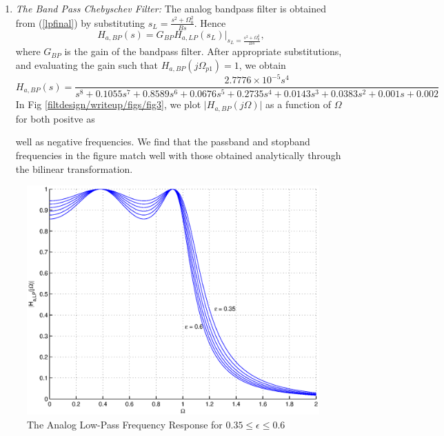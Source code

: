 \documentclass{article}
\begin{document}
\begin{enumerate}
\item {\em The Band Pass Chebyschev Filter:}  The analog bandpass filter is obtained from (\ref{lpfinal}) by substituting
$s_L = \frac{s^2 + \Omega_0^2}{Bs}$.  Hence
\begin{equation}
H_{a,BP}(s) = G_{BP}H_{a,LP}(s_L)\vert_{s_L = \frac{s^2 + \Omega_0^2}{Bs}},
\end{equation}
where $G_{BP}$ is the gain of the bandpass filter.  After appropriate substitutions, and evaluating the gain 
such that $H_{a,BP}(j\Omega_{p1}) = 1$, we obtain
{\tiny
\begin{equation}
\label{bpfinal}
H_{a,BP}(s) = \frac{2.7776\times 10^{-5}s^4}{s^8+0.1055s^7+0.8589s^6+0.0676s^5+0.2735s^4+0.0143s^3+0.0383s^2+0.001s+0.002}
\end{equation}
}
In Fig \ref{filtdesign/writeup/figs/fig3}, we plot $\vert H_{a,BP}(j\Omega)\vert$ as a function of $\Omega$ for both positve as
	
well as negative frequencies.  We find that the passband and stopband frequencies in the figure
match well with those obtained analytically through the bilinear transformation.
\end{enumerate}
\begin{figure}
\includegraphics[width = \columnwidth]{filtdesign/writeup/figs/fig1.eps}
\caption{The Analog Low-Pass Frequency Response for $0.35 \leq \epsilon \leq 0.6$}
	\label{filtdesign/writeup/figs/fig1}
\end{figure}
\end{document}
